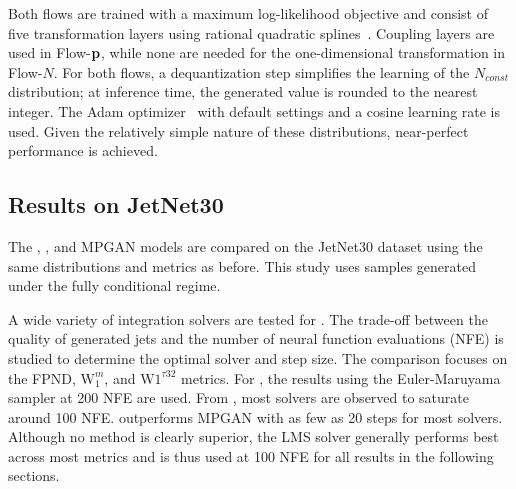 Both flows are trained with a maximum log-likelihood objective and consist of five transformation layers using rational quadratic splines~\cite{NeuralSplineFlows}.
Coupling layers are used in Flow-$\mathbf{p}$, while none are needed for the one-dimensional transformation in Flow-$N$.
For both flows, a dequantization step simplifies the learning of the $N_{const}$ distribution; at inference time, the generated value is rounded to the nearest integer.
The Adam optimizer~\cite{Adam} with default settings and a cosine learning rate is used.
Given the relatively simple nature of these distributions, near-perfect performance is achieved.

\subsection{Results on JetNet30}

The \pcdroid, \pcjedi, and MPGAN models are compared on the JetNet30 dataset using the same distributions and metrics as before.
This study uses \pcdroid samples generated under the fully conditional regime.

A wide variety of integration solvers are tested for \pcdroid.
The trade-off between the quality of generated jets and the number of neural function evaluations (NFE) is studied to determine the optimal solver and step size.
The comparison focuses on the FPND, $\mathrm{W}_1^m$, and $\mathrm{W}1^{\tau{32}}$ metrics.
For \pcjedi, the results using the Euler-Maruyama sampler at 200 NFE are used.
From , most solvers are observed to saturate around 100 NFE.
\pcdroid outperforms MPGAN with as few as 20 steps for most solvers.
Although no method is clearly superior, the LMS solver generally performs best across most metrics and is thus used at 100 NFE for all \pcdroid results in the following sections.

